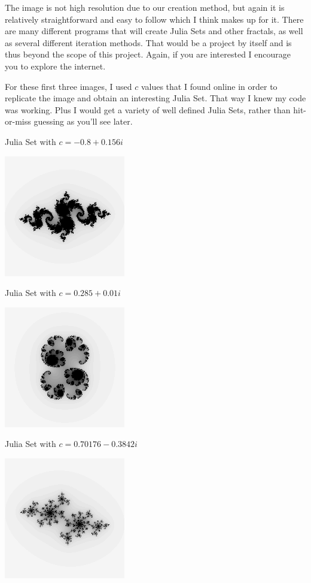 \documentclass{article}
\begin{document}
The image is not high resolution due to our creation method, but again it is relatively straightforward and easy to follow which I think makes up for it.  There are many different programs that will create Julia Sets and other fractals, as well as several different iteration methods.  That would be a project by itself and is thus beyond the scope of this project.  Again, if you are interested I encourage you to explore the internet.


\clearpage
\begin{center}

For these first three images, I used $c$ values that I found online in order to replicate the image and obtain an interesting Julia Set.  That way I knew my code was working.  Plus I would get a variety of well defined Julia Sets, rather than hit-or-miss guessing as you'll see later.

\bigskip
Julia Set with $c = -0.8 + 0.156i$

\includegraphics{Julia1}

Julia Set with $c = 0.285 + 0.01i$

\includegraphics{Julia2}

\clearpage

Julia Set with $c = 0.70176 - 0.3842i$

\includegraphics{Julia3}


\end{center}
\end{document}
